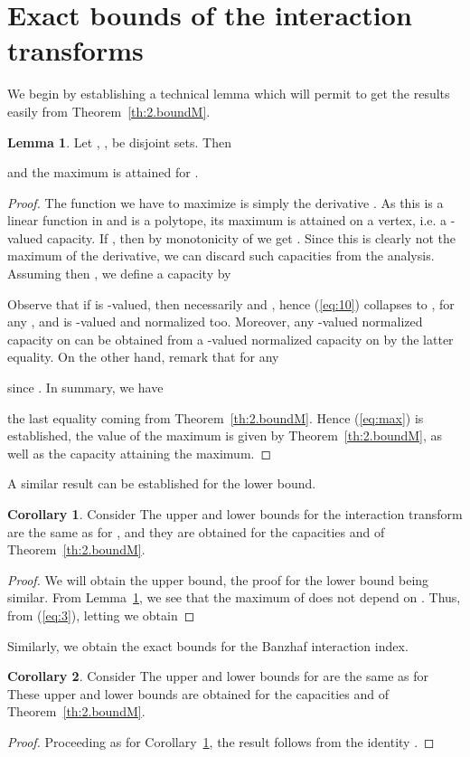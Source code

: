 \documentclass[12pt,a4paper]{article}
\theoremstyle{definition}
\newtheorem{lemma}{Lemma}
\newtheorem{corollary}{Corollary}
\theoremstyle{remark}
\begin{document}
\section{Exact bounds of the interaction transforms}
We begin by establishing a technical lemma which will permit to get the results
easily from Theorem~\ref{th:2.boundM}.
\begin{lemma}\label{lem:1}
Let , , be disjoint sets. Then

and the maximum is attained for .
\end{lemma}
\begin{proof}
The function we have to maximize is simply the derivative .  As
this is a linear function in  and  is a polytope, its maximum is
attained on a vertex, i.e. a -valued capacity. If , then by monotonicity of  we get . Since this
is clearly not the maximum of the derivative, we can discard such capacities
 from the analysis. Assuming then , we define a
capacity  by

Observe that if  is -valued, then necessarily  and , hence (\ref{eq:10}) collapses to , for any , and  is -valued and normalized too.
Moreover, any -valued normalized capacity on  can be obtained from a
-valued normalized capacity on  by the latter equality. 
  On the other hand, remark that for any 

since . In summary, we have

the last equality coming from Theorem~\ref{th:2.boundM}. Hence
(\ref{eq:max}) is established, the value of the maximum is given by
Theorem~\ref{th:2.boundM}, as well as the capacity attaining the maximum.
\end{proof}
A similar result can be established for the lower bound.
\begin{corollary}\label{cor:1}
Consider  The upper and lower bounds for the interaction
transform  are the same as
for , and they are obtained for the capacities 
and  of Theorem~\ref{th:2.boundM}.
\end{corollary}
\begin{proof}
We will obtain the upper bound, the proof for the lower bound being
similar. From Lemma~\ref{lem:1}, we see that the maximum of  does
not depend on . Thus, from (\ref{eq:3}), letting
 we obtain

\end{proof}

Similarly, we obtain the exact bounds for the Banzhaf interaction index.
\begin{corollary}
Consider  The upper and lower bounds for  are the same as
for  These upper and lower bounds are obtained for the capacities 
and  of Theorem~\ref{th:2.boundM}.
\end{corollary}
\begin{proof}
Proceeding as for Corollary~\ref{cor:1}, the result follows from the identity .
\end{proof}
\end{document}
